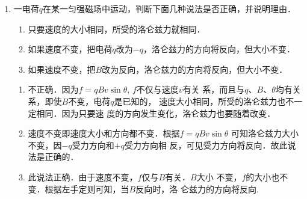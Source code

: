 \begin{enumerate}
    \item 一电荷$q$在某一匀强磁场中运动，判断下面几种说法是否正确，并说明理由．
\begin{enumerate}
    \item 只要速度的大小相同，所受的洛仑兹力就相同．
    \item 如果速度不变，把电荷$q$改为$-q$，洛仑兹力的方向将反向，但大小不变．
    \item 如果速度不变，把$B$改为反向，洛仑兹力的方向将反向，但大小不变．
\end{enumerate}


\begin{solution}
\begin{enumerate}
    \item 不正确．因为$f=qBv\sin\theta$, $f$不仅与速度$v$有关
    系，而且与$q$、$B$、$\theta$均有关系，即使$B$不变，电荷$q$是已知的，
    速度大小相同，所受的洛仑兹力也不一定相同．因为只要速
    度的方向发生变化，洛仑兹力也要随着改变．
    \item 速度不变即速度大小和方向都不变．根据$f=qBv\sin\theta$
    可知洛仑兹力大小不变，因$-q$受力方向和$+q$受力方向相
    反，可见受力方向将反向．故此说法是正确的．
    \item 此说法正确．由于速度不变，$f$仅与$B$有关．$B$大小
    不变，$f$的大小也不变．根据左手定则可知，当$B$反向时，洛
    仑兹力的方向将反向.
\end{enumerate}
\end{solution}

\end{enumerate}



 
